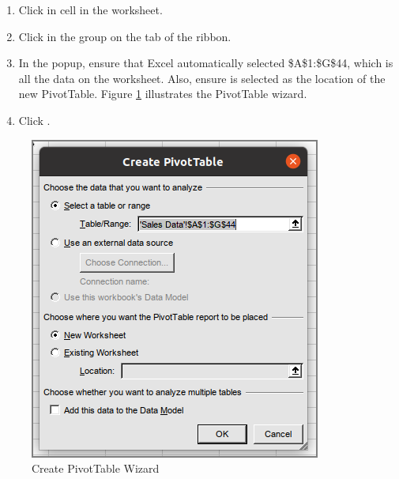 \begin{enumerate}
	\item Click in cell  in the  worksheet.
	\item Click  in the  group on the  tab of the ribbon.
	\item In the  popup, ensure that Excel automatically selected \$A\$1:\$G\$44, which is all the data on the worksheet. Also, ensure  is selected as the location of the new PivotTable. Figure \ref{07:fig12} illustrates the PivotTable wizard.
	\item Click .
\end{enumerate}

\begin{figure}[H]
	\centering
	\includegraphics[width=\maxwidth{.95\linewidth}]{gfx/ch07_fig12}
	\caption{Create PivotTable Wizard}
	\label{07:fig12}
\end{figure}


